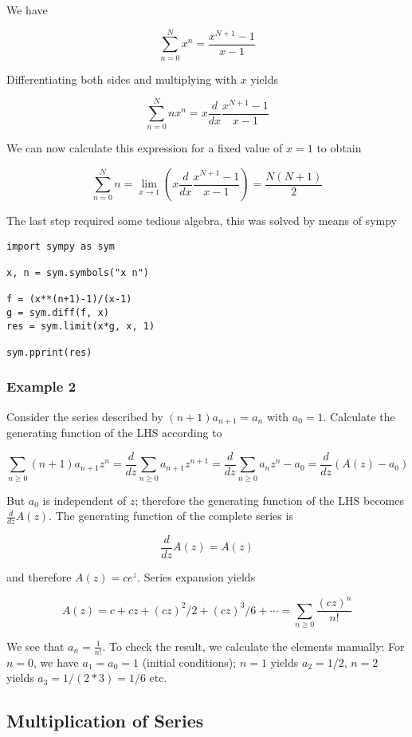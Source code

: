 We have

\[ \sum_{n=0}^N x^n = \frac{x^{N+1}-1}{x-1} \]

Differentiating both sides and multiplying with $x$ yields

\[ \sum_{n=0}^N n x^n = x \frac{d}{dx} \frac{x^{N+1}-1}{x-1} \]

We can now calculate this expression for a fixed value of $x=1$ to obtain

\[ \sum_{n=0}^N n = \lim_{x \rightarrow 1} \left( x \frac{d}{dx} \frac{x^{N+1}-1}{x-1} \right) =\frac{N(N+1)}{2} \]

The last step required some tedious algebra, this was solved by means of sympy

\begin{verbatim}
import sympy as sym

x, n = sym.symbols("x n")

f = (x**(n+1)-1)/(x-1)
g = sym.diff(f, x)
res = sym.limit(x*g, x, 1)

sym.pprint(res)
\end{verbatim}

\subsubsection{Example 2}\label{example-2}

Consider the series described by $(n+1) a_{n+1} = a_n$ with $a_0=1$. Calculate the generating function of the LHS according to

\[ \sum_{n \geq 0} (n+1) a_{n+1} z^n = \frac{d}{dz} \sum_{n \geq 0} a_{n+1} z^{n+1} = \frac{d}{dz} \sum_{n \geq 0} a_{n} z^{n} - a_0 = \frac{d}{dz} \left( A(z) - a_0 \right) \]

But $a_0$ is independent of $z$; therefore the generating function of the LHS becomes $\frac{d}{dz} A(z)$. The generating function of the complete series is

\[\frac{d}{dz} A(z) = A(z)\]

and therefore $A(z) = c e^z$. Series expansion yields

\[ A(z) = c + cz + (cz)^2/2 + (cz)^3/6 + \cdots = \sum_{n \geq 0} \frac{(cz)^n}{n!}\]

We see that $a_n = \frac{1}{n!}$. To check the result, we calculate the elements manually: For $n=0$, we have $a_1 = a_0 = 1$ (initial conditions); $n=1$ yields $a_2 = 1 / 2$, $n=2$ yields
$a_3 = 1/(2*3) = 1/6$ etc.

\subsection{Multiplication of Series}\label{multiplication-of-series}

